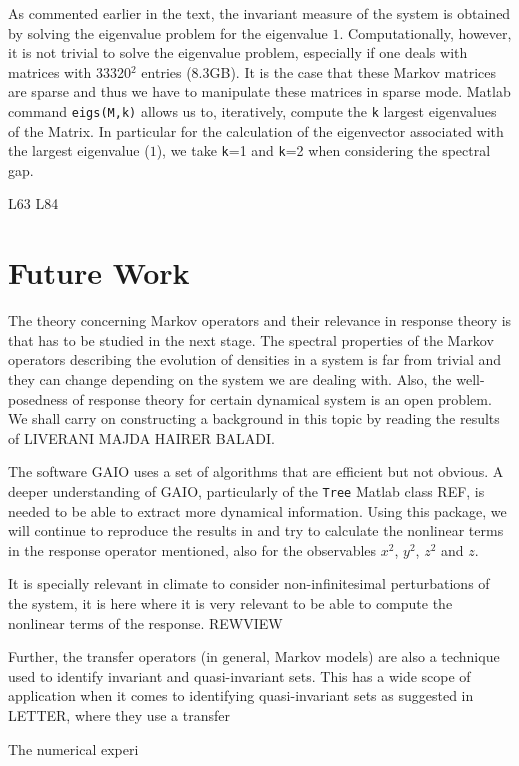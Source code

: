 As commented earlier in the text, the invariant measure of the system is obtained by solving the eigenvalue problem for the eigenvalue $1$. Computationally, however, it is not trivial to solve the eigenvalue problem, especially if one deals with matrices with 33320$^2$ entries (8.3GB). It is the case that these Markov matrices are sparse and thus we have to manipulate these matrices in sparse mode. Matlab command \texttt{eigs(M,k)} allows us to, iteratively, compute the \texttt{k} largest eigenvalues of the Matrix. In particular for the calculation of the eigenvector associated with the largest eigenvalue ($1$), we take \texttt{k}=1 and \texttt{k}=2 when considering the spectral gap.



L63
L84

\section*{Future Work}

The theory concerning Markov operators and their relevance in response theory is that has to be studied in the next stage. The spectral properties of the Markov operators describing the evolution of densities in a system is far from trivial and they can change depending on the system we are dealing with. Also, the well-posedness of response theory for certain dynamical system is an open problem. We shall carry on constructing a background in this topic by reading the results of LIVERANI MAJDA HAIRER BALADI.

The software GAIO uses a set of algorithms that are efficient but not obvious. A deeper understanding of GAIO, particularly of the \texttt{Tree} Matlab class REF, is needed to be able to extract more dynamical information. Using this package, we will continue to reproduce the results in \cite{lucarini} and try to calculate the nonlinear terms in the response operator mentioned, also for the observables $x^2$, $y^2$, $z^2$ and $z$.

It is specially relevant in climate to consider non-infinitesimal perturbations of the system, it is here where it is very relevant to be able to compute the nonlinear terms of the response. REWVIEW

Further, the transfer operators (in general, Markov models) are also a technique used to identify invariant and quasi-invariant sets. This has a wide scope of application when it comes to identifying quasi-invariant sets as suggested in LETTER, where they use a transfer 

The numerical experi


